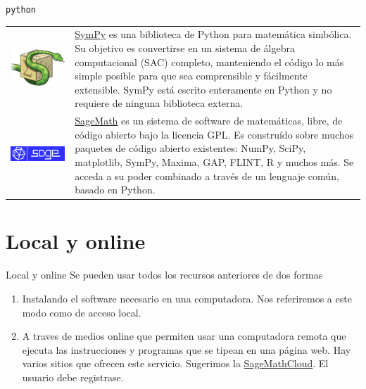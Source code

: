 \documentclass[hyperref={colorlinks=true}]{beamer}
\begin{document}
\begin{frame}{\texttt{python}}
\begin{tabular}{m{.2\linewidth} m{.8\linewidth} }
\includegraphics[scale=.25]{imagenes/sympy_logo.png} & \href{http://www.sympy.org/}{SymPy} 
es una biblioteca de Python para matemática simbólica. Su objetivo es convertirse en un sistema de álgebra computacional (SAC) completo, manteniendo el código lo más simple posible para que sea comprensible y fácilmente extensible. SymPy está escrito enteramente en Python y no requiere de ninguna biblioteca externa.\\

\includegraphics[scale=.13]{imagenes/sage_logo.png} & \href{http://www.sagemath.org/}{SageMath}  es un sistema de software de matemáticas, libre, de código abierto bajo la licencia GPL. Es construído sobre  muchos paquetes de código abierto existentes: NumPy, SciPy, matplotlib, SymPy, Maxima, GAP, FLINT, R y muchos más. Se acceda a su poder combinado a través de un lenguaje común, basado en Python.
\end{tabular}

\end{frame}

\section{Local y online} 

\begin{frame}{Local y online}
\onslide<+->Se pueden usar todos los recursos anteriores de dos formas 
\begin{enumerate}
\item<+-> Instalando el software necesario en una computadora. Nos referiremos a este modo como de acceso local.

\item<+-> A traves de medios online que permiten usar una computadora remota que ejecuta las instrucciones y programas que se tipean en una página web.  Hay varios sitios que ofrecen este servicio. Sugerimos la \href{https://cloud.sagemath.com/}{SageMathCloud}. El usuario debe registrase.
\end{enumerate}
\end{frame}
\end{document}
